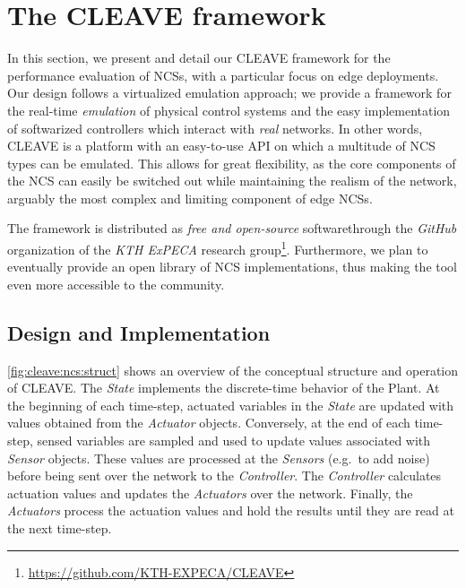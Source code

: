 \section{The \ac{CLEAVE} framework}\label{sec:approach}

In this section, we present and detail our \ac{CLEAVE} framework for the performance evaluation of \aclp{NCS}, with a particular focus on edge deployments.
Our design follows a virtualized emulation approach; we provide a framework for the real-time \emph{emulation} of physical control systems and the easy implementation of softwarized controllers which interact with \emph{real} networks.
In other words, \ac{CLEAVE} is a platform with an easy-to-use \ac{API} on which a multitude of \ac{NCS} types can be emulated.
This allows for great flexibility, as the core components of the \ac{NCS} can easily be switched out while maintaining the realism of the network, arguably the most complex and limiting component of edge \acp{NCS}.

The framework is distributed as \emph{free and open-source} softwarethrough the \emph{GitHub} organization of the \emph{KTH ExPECA} research group\footnote{\url{https://github.com/KTH-EXPECA/CLEAVE}}.
Furthermore, we plan to eventually provide an open library of \ac{NCS} implementations, thus making the tool even more accessible to the community.

\subsection{Design and Implementation}

\cref{fig:cleave:ncs:struct} shows an overview of the conceptual structure and operation of \ac{CLEAVE}.
The \emph{State} implements the discrete-time behavior of the Plant.
At the beginning of each time-step, actuated variables in the \emph{State} are updated with values obtained from the \emph{Actuator} objects.
Conversely, at the end of each time-step, sensed variables are sampled and used to update values associated with \emph{Sensor} objects.
These values are processed at the \emph{Sensors} (e.g.\ to add noise) before being sent over the network to the \emph{Controller}.
The \emph{Controller} calculates actuation values and updates the \emph{Actuators} over the network.
Finally, the \emph{Actuators} process the actuation values and hold the results until they are read at the next time-step.

